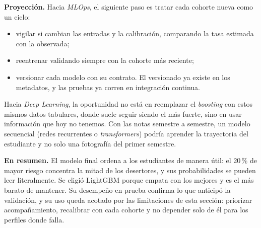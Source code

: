 \documentclass[11pt,a4paper]{article}
\begin{document}
\textbf{Proyección.} Hacia \textit{MLOps}, el siguiente paso es tratar cada cohorte nueva como un ciclo:
\begin{itemize}[leftmargin=1.3em,itemsep=1pt,topsep=2pt]
\item vigilar si cambian las entradas y la calibración, comparando la tasa estimada con la observada;
\item reentrenar validando siempre con la cohorte más reciente;
\item versionar cada modelo con su contrato. El versionado ya existe en los metadatos, y las pruebas ya corren en integración continua.
\end{itemize}
Hacia \textit{Deep Learning}, la oportunidad no está en reemplazar el \textit{boosting} con estos mismos datos tabulares, donde suele seguir siendo el más fuerte, sino en usar información que hoy no tenemos. Con las notas semestre a semestre, un modelo secuencial (redes recurrentes o \textit{transformers}) podría aprender la trayectoria del estudiante y no solo una fotografía del primer semestre.

\textbf{En resumen.} El modelo final ordena a los estudiantes de manera útil: el 20\,\% de mayor riesgo concentra la mitad de los desertores, y sus probabilidades se pueden leer literalmente. Se eligió LightGBM porque empata con los mejores y es el más barato de mantener. Su desempeño en prueba confirma lo que anticipó la validación, y su uso queda acotado por las limitaciones de esta sección: priorizar acompañamiento, recalibrar con cada cohorte y no depender solo de él para los perfiles donde falla.
\end{document}
